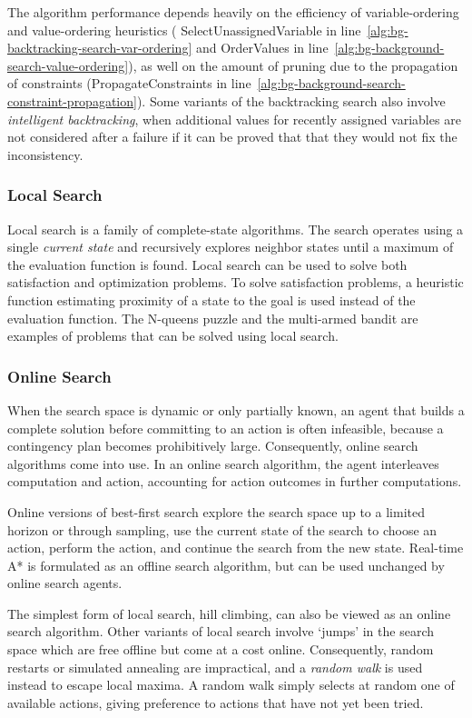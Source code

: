 The algorithm performance depends heavily on the efficiency of
variable-ordering and value-ordering heuristics ({\sc
  SelectUnassignedVariable} in
line~\ref{alg:bg-backtracking-search-var-ordering}
and {\sc  OrderValues} in
line~\ref{alg:bg-background-search-value-ordering}), as well on the
amount of pruning due to the propagation of constraints
({\sc PropagateConstraints} in line~\ref{alg:bg-background-search-constraint-propagation}). Some
variants of the backtracking search also involve {\em intelligent
  backtracking}, when additional values for recently assigned
variables are not considered after a failure if it can be proved
that that they would not fix the inconsistency.

\subsubsection{Local Search}

Local search is a family of complete-state algorithms. The search
operates using a single {\em current state} and recursively explores
neighbor states until a maximum of the evaluation function is
found. Local search can be used to solve both satisfaction and
optimization problems. To solve satisfaction problems, a heuristic
function estimating proximity of a state to the goal is used instead
of the evaluation function. The N-queens puzzle and the multi-armed
bandit are examples of problems that can be solved using local search.

\subsubsection{Online Search}

When the search space is dynamic or only partially known, an agent
that builds a complete solution before committing to an action is
often infeasible, because a contingency plan becomes prohibitively
large. Consequently, online search algorithms come into use. In an
online search algorithm, the agent interleaves computation and action,
accounting for action outcomes in further computations.

Online versions of best-first search explore the search space up to a
limited horizon or through sampling, use the current state
of the search to choose an action, perform the action, and continue
the search from the new state. Real-time A* is formulated as an offline
search algorithm, but can be used unchanged by online search agents.

The simplest form of local search, hill climbing, can also be
viewed as an online search algorithm. Other variants of local search
involve `jumps' in the search space which are free offline but come at
a cost online. Consequently, random restarts or simulated annealing
are impractical, and a {\em random walk} is used instead to escape
local maxima. A random walk simply selects at random one of available
actions, giving preference to actions that have not yet been tried.

